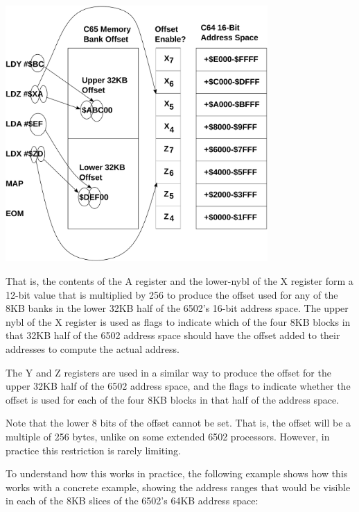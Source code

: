 \begin{center}
  \includegraphics[width=0.75\textwidth]{images/illustrations/map-instruction-operation.pdf}
\end{center}

That is, the contents of the A register and the lower-nybl of the X register form a 12-bit value
that is multiplied by 256 to produce the offset used for any of the 8KB banks in the lower 32KB half of the 6502's 16-bit address
space.  The upper nybl of the X register is used as flags to indicate which of the four 8KB blocks in that 32KB half of the
6502 address space should have the offset added to their addresses to compute the actual address.

The Y and Z registers are used in a similar way to produce the offset for the upper 32KB half of the 6502 address space, and the
flags to indicate whether the offset is used for each of the four 8KB blocks in that half of the address space.

Note that the lower 8 bits of the offset cannot be set. That is, the offset will be a multiple of 256
bytes, unlike on some extended 6502 processors.  However, in practice this restriction is rarely
limiting.

To understand how this works in practice, the following example shows how this works with a concrete
example, showing the address ranges that would be visible in each of the 8KB slices of the 6502's
64KB address space:

